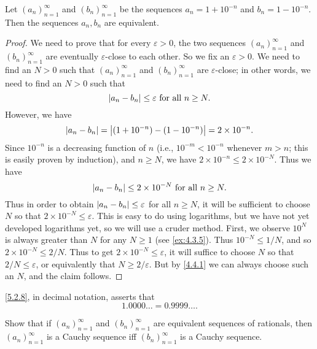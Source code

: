\begin{prop}\label{5.2.8}
  Let \((a_n)_{n = 1}^{\infty}\) and \((b_n)_{n = 1}^{\infty}\) be the sequences \(a_n = 1 + 10^{-n}\) and \(b_n = 1 - 10^{-n}\).
  Then the sequences \(a_n, b_n\) are equivalent.
\end{prop}

\begin{proof}
  We need to prove that for every \(\varepsilon > 0\), the two sequences \((a_n)_{n = 1}^{\infty}\) and \((b_n)_{n = 1}^{\infty}\) are eventually \(\varepsilon\)-close to each other.
  So we fix an \(\varepsilon > 0\).
  We need to find an \(N > 0\) such that \((a_n)_{n = 1}^{\infty}\) and \((b_n)_{n = 1}^{\infty}\) are \(\varepsilon\)-close;
  in other words, we need to find an \(N > 0\) such that
  \[
    \left\lvert a_n - b_n\right\rvert \leq \varepsilon \text{ for all } n \geq N.
  \]
  However, we have
  \[
    \left\lvert a_n - b_n\right\rvert = \left\lvert(1 + 10^{-n}) - (1 - 10^{-n})\right\rvert = 2 \times 10^{-n}.
  \]
  Since \(10^{-n}\) is a decreasing function of \(n\) (i.e., \(10^{-m} < 10^{-n}\) whenever \(m > n\);
  this is easily proven by induction), and \(n \geq N\), we have \(2 \times 10^{-n} \leq 2 \times 10^{-N}\).
  Thus we have
  \[
    \left\lvert a_n - b_n\right\rvert \leq 2 \times 10^{-N} \text{ for all } n \geq N.
  \]
  Thus in order to obtain \(\left\lvert a_n - b_n\right\rvert \leq \varepsilon\) for all \(n \geq N\), it will be sufficient to choose \(N\) so that \(2 \times 10^{-N} \leq \varepsilon\).
  This is easy to do using logarithms, but we have not yet developed logarithms yet, so we will use a cruder method.
  First, we observe \(10^N\) is always greater than \(N\) for any \(N \geq 1\) (see \cref{ex:4.3.5}).
  Thus \(10^{-N} \leq 1 / N\), and so \(2 \times 10^{-N} \leq 2 / N\).
  Thus to get \(2 \times 10^{-N} \leq \varepsilon\), it will suffice to choose \(N\) so that \(2 / N \leq \varepsilon\), or equivalently that \(N \geq 2 / \varepsilon\).
  But by \cref{4.4.1} we can always choose such an \(N\), and the claim follows.
\end{proof}

\begin{rmk}\label{5.2.9}
  \cref{5.2.8}, in decimal notation, asserts that
  \[
    1.0000 \dots = 0.9999 \dots.
  \]
\end{rmk}

\exercisesection

\begin{ex}\label{ex:5.2.1}
  Show that if \((a_n)_{n = 1}^{\infty}\) and \((b_n)_{n = 1}^{\infty}\) are equivalent sequences of rationals, then \((a_n)_{n = 1}^{\infty}\) is a Cauchy sequence iff \((b_n)_{n = 1}^{\infty}\) is a Cauchy sequence.
\end{ex}

